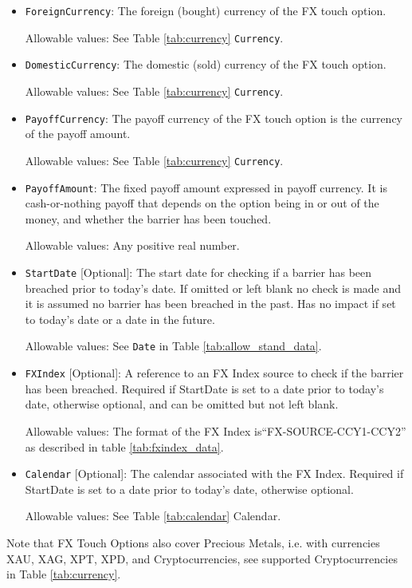 \begin{itemize}
\item \lstinline!ForeignCurrency!: The foreign (bought) currency of the FX touch option.  

Allowable values:  See Table \ref{tab:currency} \lstinline!Currency!.

\item \lstinline!DomesticCurrency!: The domestic (sold) currency of the FX touch option.

Allowable values:  See Table \ref{tab:currency} \lstinline!Currency!.

\item \lstinline!PayoffCurrency!: The payoff currency of the FX touch option is the currency of the payoff amount. 

Allowable values:  See Table \ref{tab:currency} \lstinline!Currency!.

\item \lstinline!PayoffAmount!: The fixed payoff amount expressed in payoff currency. It is cash-or-nothing payoff that depends on the option being in or out of the money, and whether the barrier has been touched.

Allowable values:  Any positive real number.

\item \lstinline!StartDate! [Optional]: The start date for checking if a barrier has been breached prior to today's date.  If omitted or left blank no check is made and it is assumed no barrier has been breached in the past. Has no impact if set to today's date or a date in the future.

Allowable values:  See \lstinline!Date! in Table \ref{tab:allow_stand_data}.

\item \lstinline!FXIndex! [Optional]: A reference to an FX Index source to check if the barrier has been breached. Required if StartDate is set to a date prior to today's date, otherwise optional, and can be omitted but not left blank.

Allowable values: The format of the FX Index is``FX-SOURCE-CCY1-CCY2'' as described in table \ref{tab:fxindex_data}.  

\item \lstinline!Calendar! [Optional]: The calendar associated with the FX Index. Required if StartDate is set to a date prior to today's date, otherwise optional.

Allowable values: See Table \ref{tab:calendar} Calendar.
\end{itemize}

Note that FX Touch Options also cover Precious Metals, i.e. with
currencies XAU, XAG, XPT, XPD, and Cryptocurrencies,  see supported Cryptocurrencies in Table \ref{tab:currency}.
